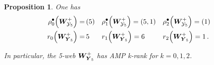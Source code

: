 \documentclass[11pt]{amsart}
\newcommand{\sk}{\smallskip}
\newtheorem{prop}[thm]{Proposition}
\begin{document}
\begin{prop}
  One has 
\begin{align*}
\rho^{\bullet}_0\Big( 
\boldsymbol{W}^{+}_{ \hspace{-0.05cm} {\mathcal Y}_5}
\Big)
= &  \,   (5)
&&
\rho^{\bullet}_1\Big( 
\boldsymbol{W}^{+}_{ \hspace{-0.05cm} {\mathcal Y}_5}
\Big)
= ( 5,1 )
&& \rho^{\bullet}_2\Big( 
\boldsymbol{W}^{+}_{ \hspace{-0.05cm}  {\mathcal Y}_5}
\Big)
=  (1) 
\\
r_0\Big( 
\boldsymbol{W}^{+}_{\hspace{-0.05cm}\boldsymbol{Y}_5}
\Big)
=  &   \, 5
&&
r_1\Big( 
\boldsymbol{W}^{+}_{\hspace{-0.05cm}\boldsymbol{Y}_5}
\Big)
=   6
&& r_2\Big( 
\boldsymbol{W}^{+}_{\hspace{-0.05cm}\boldsymbol{Y}_5}
\Big)
=   1\, .
\end{align*}

In particular,  the 5-web $\boldsymbol{W}^{+}_{\hspace{-0.05cm}\boldsymbol{Y}_5}$ has AMP k-rank for $k=0,1,2$. \sk 
\end{prop}%



\end{document}
